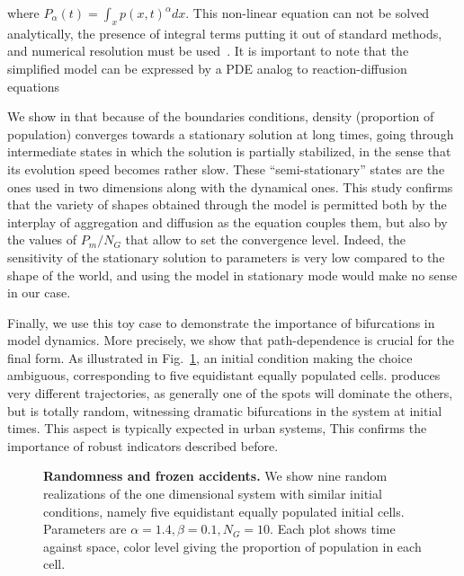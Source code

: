 \documentclass[10pt,letterpaper]{article}
\begin{document}
where $P_{\alpha}(t) = \int_x p(x,t)^{\alpha} dx$. This non-linear equation can not be solved analytically, the presence of integral terms putting it out of standard methods, and numerical resolution must be used~\cite{tadmor2012review}. It is important to note that the simplified model can be expressed by a PDE analog to reaction-diffusion equations

We show in  that because of the boundaries conditions, density (proportion of population) converges towards a stationary solution at long times, going through intermediate states in which the solution is partially stabilized, in the sense that its evolution speed becomes rather slow. These ``semi-stationary'' states are the ones used in two dimensions along with the dynamical ones. This study confirms that the variety of shapes obtained through the model is permitted both by the interplay of aggregation and diffusion as the equation couples them, but also by the values of $P_m / N_G$ that allow to set the convergence level. Indeed, the sensitivity of the stationary solution to parameters is very low compared to the shape of the world, and using the model in  stationary mode would make no sense in our case.

Finally, we use this toy case to demonstrate the importance of bifurcations in model dynamics. More precisely, we show that path-dependence is crucial for the final form. As illustrated in Fig.~\ref{fig:fig5},  an initial condition making the  choice ambiguous, corresponding to five equidistant equally populated cells.  produces very different trajectories, as generally one of the spots will  dominate the others, but is totally random, witnessing dramatic bifurcations in the system at initial times. This aspect is typically expected in urban systems,  This confirms the importance of robust indicators described before.


\begin{figure}
\caption{\textbf{Randomness and frozen accidents.} We show nine random realizations of the one dimensional system with similar initial conditions, namely five equidistant equally populated initial cells. Parameters are $\alpha = 1.4,\beta =0.1,N_G=10$. Each plot shows time against space, color level giving the proportion of population in each cell.}
\label{fig:fig5}
\end{figure}
\end{document}
